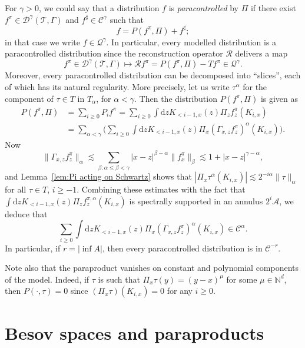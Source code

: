 \documentclass[a4paper,11pt]{article}
\newcommand{\mathd}{\mathrm{d}}
\theoremstyle{remark}
\newcommand{\N}{\mathbb{N}}
\newcommand{\CA}{\ensuremath{\mathscr{A}}}
\newcommand{\CC}{\ensuremath{\mathscr{C}}}
\begin{document}
For $\gamma > 0$, we could say that a distribution $f$ is \emph{paracontrolled} by $\Pi$ if there exist
$f^{\pi} \in \mathcal{D}^{\gamma}( \mathcal{T}, \Gamma )$ and $f^{\sharp} \in \mathcal{C}^{\gamma}$
such that
\[
   f=P ( f^{\pi} , \Pi ) +f^{\sharp};
\]
in that case we write $f \in \mathcal{Q}^{\gamma}$. In particular, every
modelled distribution is a paracontrolled distribution since the
reconstruction operator $\mathcal{R}$ delivers a map
\[
   f^{\pi} \in \mathcal{D}^{\gamma}( \mathcal{T}, \Gamma ) \longmapsto \mathcal{R}f^{\pi} =P (f^{\pi} , \Pi ) -T f^{\pi} \in \mathcal{Q}^{\gamma}.
\]
Moreover, every paracontrolled distribution can be decomposed into ``slices'', each of which has its natural regularity. More precisely, let us write $\tau^\alpha$ for the component of $\tau \in T$ in $T_\alpha$, for $\alpha < \gamma$. Then the distribution $P(f^\pi, \Pi)$ is given as
\begin{align*}
   P(f^\pi, \Pi) & = \sum_{i \geqslant 0} P_i f^\pi =\sum_{i \geqslant 0} \int \mathd zK_{< i-1,x} ( z ) \Pi_{z} f^{\pi}_{z} ( K_{i,x} ) \\
   & = \sum_{\alpha < \gamma} \Big( \sum_{i \geqslant 0} \int \mathd zK_{< i-1,x} ( z ) \Pi_{x} (\Gamma_{x,z} f^{\pi}_z)^\alpha ( K_{i,x} ) \Big).
\end{align*}
Now
\[
   \|\Gamma_{x,z} f^{\pi}_z \|_\alpha \lesssim \sum_{\beta: \alpha \leqslant \beta < \gamma} |x-z|^{\beta-\alpha} \|f^\pi_x\|_\beta \lesssim 1 + |x-z|^{\gamma-\alpha},
\]
and Lemma~\ref{lem:Pi acting on Schwartz} shows that $|\Pi_x \tau^\alpha(K_{i,x} )| \lesssim 2^{-i\alpha} \|\tau\|_\alpha$ for all $\tau \in T$, $i \geqslant -1$. Combining these estimates with the fact that $\int \mathd zK_{< i-1,x} ( z ) \Pi_{z} f^{\pi,\alpha}_{z} ( K_{i,x} )$ is spectrally supported in an annulus $2^i \CA$, we deduce that
\[
   \sum_{i \geqslant 0} \int \mathd zK_{< i-1,x} ( z ) \Pi_{x} (\Gamma_{x,z} f^{\pi}_z)^\alpha ( K_{i,x} ) \in \CC^\alpha.
\]
In particular, if $r = |\inf A|$, then every paracontrolled distribution is in $\CC^{-r}$.

Note also
that the paraproduct vanishes on constant and polynomial components of the model. Indeed, if $\tau$ is such that $\Pi_{x} \tau ( y ) = ( y-x )^{\mu}$ for some $\mu \in \N^d$, then $P ( \cdot , \tau ) =0$ since $( \Pi_{x} \tau ) ( K_{i,x}) =0$ for any $i \geqslant 0$.



\appendix


\section{Besov spaces and paraproducts}\label{sec:para}
\end{document}
